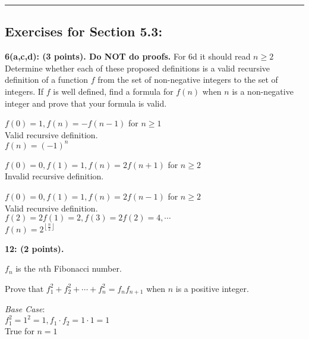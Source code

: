\documentclass[12pt]{article}  %
\begin{document}
\rule{6in}{.1pt}       %


\subsection*{Exercises for Section 5.3:}     

\noindent
{\bf 6(a,c,d): (3 points). Do NOT do proofs.} For 6d it should read $n\geq 2$\\
\noindent
Determine whether each of these proposed definitions is a valid recursive definition of a function $f$ from the set of non-negative integers to the set of integers. If $f$ is well defined, find a formula for $f(n)$ when $n$ is a non-negative integer and prove that your formula is valid.

\noindent $f(0)=1,f(n)=-f(n-1)$ for $n\geq1$\\
Valid recursive definition.\\
$f(n)=(-1)^n$

\noindent $f(0)=0,f(1)=1,f(n)=2f(n+1)$ for $n\geq2$\\
Invalid recursive definition.

\noindent $f(0)=0,f(1)=1,f(n)=2f(n-1)$ for $n\geq2$\\
Valid recursive definition.\\
$f(2)=2f(1)=2,f(3)=2f(2)=4,\cdots$\\
$\displaystyle f(n)=2^{\left\lfloor \frac{n}{2}\right\rfloor}$

\noindent
{\bf 12: (2 points).}

\noindent
$f_n$ is the $n$th Fibonacci number.

\noindent
Prove that $\displaystyle f_1^2+f_2^2+\cdots+f_n^2=f_{n}f_{n+1}$ when $n$ is a positive integer.

\noindent
\textit{Base Case}:\\
$f_1^2=1^2=1, f_1\cdot f_2=1\cdot1=1$\\
True for $n=1$
\end{document}

